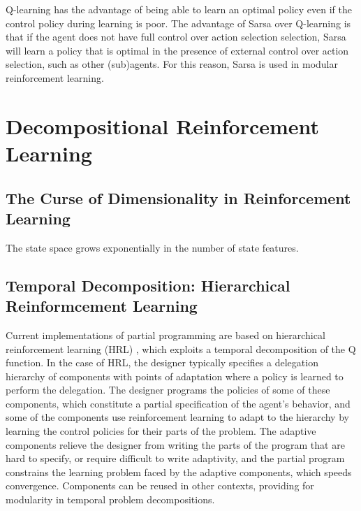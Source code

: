 Q-learning has the advantage of being able to learn an optimal policy even if the control policy during learning is poor. The advantage of Sarsa over Q-learning is that if the agent does not have full control over action selection selection, Sarsa will learn a policy that is optimal in the presence of external control over action selection, such as other (sub)agents. For this reason, Sarsa is used in modular reinforcement learning.

\section{Decompositional Reinforcement Learning}

\subsection{The Curse of Dimensionality in Reinforcement Learning}

The state space grows exponentially in the number of state features.





\subsection{Temporal Decomposition: Hierarchical Reinformcement Learning}

Current implementations of partial programming are based on hierarchical reinforcement learning (HRL) \cite{dietterich1998maxq,dietterich2000hierarchical,sutton1999between,parr1998reinforcement,andre2000programmable,andre2002state,marthi2005concurrent}, which exploits a temporal decomposition of the Q function.  In the case of HRL, the designer typically specifies a delegation hierarchy of components with points of adaptation where a policy is learned to perform the delegation.  The designer programs the policies of some of these components, which constitute a partial specification of the agent's behavior, and some of the components use reinforcement learning to adapt to the hierarchy by learning the control policies for their parts of the problem.  The adaptive components relieve the designer from writing the parts of the program that are hard to specify, or require difficult to write adaptivity, and the partial program constrains the learning problem faced by the adaptive components, which speeds convergence.  Components can be reused in other contexts, providing for modularity in temporal problem decompositions.

